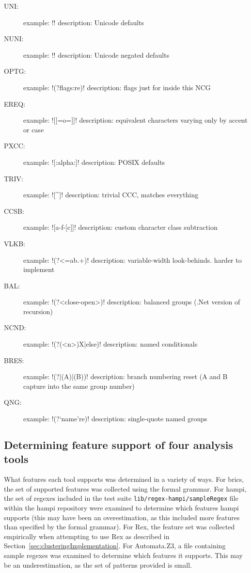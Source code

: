 \begin{description}
\item[UNI:] example: \cverb!\pL! description: Unicode defaults
\item[NUNI:] example: \cverb!\PS! description: Unicode negated defaults
\item[OPTG:] example: \cverb!(?flags:re)! description: flags just for inside this NCG
\item[EREQ:] example: \cverb![[=o=]]! description: equivalent characters varying only by accent or case
\item[PXCC:] example: \cverb![:alpha:]! description: POSIX defaults
\item[TRIV:] example: \cverb![^]! description: trivial CCC, matches everything
\item[CCSB:] example: \cverb![a-f-[c]]! description: custom character class subtraction
\item[VLKB:] example: \cverb!(?<=ab.+)! description: variable-width look-behinds.  harder to implement
\item[BAL:] example: \cverb!(?<close-open>)! description:  balanced groups (.Net version of recursion)
\item[NCND:] example: \cverb!(?(<n>)X|else)! description: named conditionals
\item[BRES:] example: \cverb!(?|(A)|(B))! description: branch numbering reset (A and B capture into the same group number)
\item[QNG:] example: \cverb!(?`name're)! description: single-quote named groups
\end{description}

\subsection*{Determining feature support of four analysis tools}
\label{app:determiningToolFeatures}
What features each tool supports was determined in a variety of ways.  For brics, the set of supported features was collected using the formal grammar.  For hampi, the set of regexes included in the test suite {\tt lib/regex-hampi/sampleRegex} file within the hampi repository were examined to determine which features hampi supports (this may have been an overestimation, as this included more features than specified by the formal grammar).  For Rex, the feature set was collected empirically when attempting to use Rex as described in Section~\ref{sec:clusteringImplementation}.  For Automata.Z3, a file containing sample regexes was examined to determine which features it supports.  This may be an underestimation, as the set of patterns provided is small.
